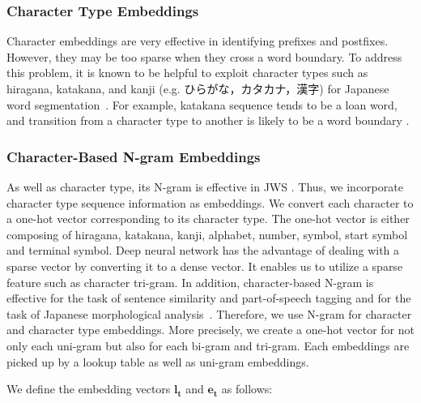 \documentclass[11pt,letterpaper]{article}
\begin{document}

\subsubsection{Character Type Embeddings}
Character embeddings are very effective in identifying prefixes and postfixes. However, they may be too sparse when they cross a word boundary. To address this problem, it is known to be helpful to exploit character types such as hiragana, katakana, and kanji (e.g. ひらがな，カタカナ，漢字) for Japanese word segmentation~\cite{neubig-nakata-mori:2011:ACL-HLT2011}. For example, katakana sequence tends to be a loan word, and transition from a character type to another is likely to be a word boundary \cite{nagata1999part}. 



\subsubsection{Character-Based N-gram Embeddings}
As well as character type, its N-gram is effective in JWS \cite{neubig-nakata-mori:2011:ACL-HLT2011}.
Thus, we incorporate character type sequence information as embeddings. 
We convert each character to a one-hot vector
corresponding to its character type. The one-hot vector is either composing of hiragana, katakana, kanji, alphabet, number, symbol, start symbol and terminal symbol. 
Deep neural network has the advantage of dealing with a sparse vector by converting it to a dense vector. 
It enables us to utilize a sparse feature such as character tri-gram. 
In addition, character-based N-gram is effective for the task of sentence similarity and part-of-speech tagging \cite{wieting-EtAl:2016:EMNLP2016} and for the task of Japanese morphological analysis~\cite{neubig-nakata-mori:2011:ACL-HLT2011}. Therefore, we use N-gram for character and character type embeddings.
More precisely, we create a one-hot vector for not only each uni-gram but also for each bi-gram and tri-gram.
Each embeddings are picked up by a lookup table as well as uni-gram embeddings.

We define the embedding vectors $\bm{l_{t}}$ and $\bm{e_{t}}$ as follows:
\end{document}
